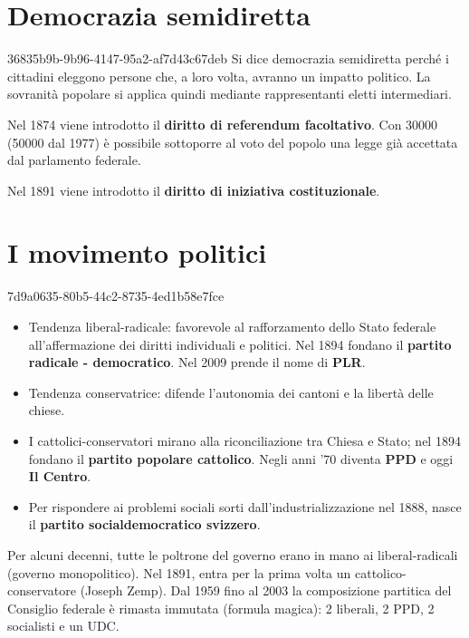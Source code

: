 \documentclass[preview]{standalone}
\begin{document}
\section{Democrazia semidiretta}

\begin{snippet}{36835b9b-9b96-4147-95a2-af7d43c67deb}
    Si dice democrazia semidiretta perché i cittadini eleggono persone che, a loro volta,
    avranno un impatto politico.
    La sovranità popolare si applica quindi mediante rappresentanti eletti intermediari.
    
    Nel 1874 viene introdotto il \textbf{diritto di referendum facoltativo}.
    Con 30000 (50000 dal 1977) è possibile sottoporre al voto del popolo una legge già accettata dal parlamento federale.
    
    Nel 1891 viene introdotto il \textbf{diritto di iniziativa costituzionale}.
\end{snippet}

\section{I movimento politici}

\begin{snippet}{7d9a0635-80b5-44c2-8735-4ed1b58e7fce}
    \begin{itemize}
        \item Tendenza liberal-radicale: favorevole al rafforzamento dello Stato federale all'affermazione dei diritti individuali e politici.
        Nel 1894 fondano il \textbf{partito radicale - democratico}.
        Nel 2009 prende il nome di \textbf{PLR}.
        \item Tendenza conservatrice: difende l'autonomia dei cantoni e la libertà delle chiese.
        \item I cattolici-conservatori mirano alla riconciliazione tra Chiesa e Stato; nel 1894 fondano il \textbf{partito popolare cattolico}.
        Negli anni '70 diventa \textbf{PPD} e oggi \textbf{Il Centro}.
        \item Per rispondere ai problemi sociali sorti dall'industrializzazione nel 1888, nasce il \textbf{partito socialdemocratico svizzero}.
    \end{itemize}
    
    Per alcuni decenni, tutte le poltrone del governo erano in mano ai liberal-radicali (governo monopolitico).
    Nel 1891, entra per la prima volta un cattolico-conservatore (Joseph Zemp).
    Dal 1959 fino al 2003 la composizione partitica del Consiglio federale è rimasta immutata (formula magica):
    2 liberali, 2 PPD, 2 socialisti e un UDC.
\end{snippet}
\end{document}
